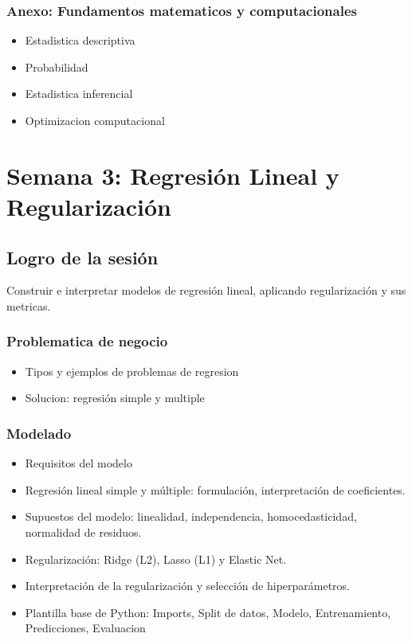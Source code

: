\documentclass[12pt,a4paper,openany,oneside]{book}
\begin{document}
\begin{itemize}
\subsection{Anexo: Fundamentos matematicos y computacionales}
\begin{itemize}
    \item Estadistica descriptiva
    \item Probabilidad
    \item Estadistica inferencial
    \item Optimizacion computacional
\end{itemize}

\chapter{Semana 3: Regresión Lineal y Regularización}

\section{Logro de la sesión}
Construir e interpretar modelos de regresión lineal, aplicando regularización y sus metricas.

\subsection{Problematica de negocio}
\begin{itemize}
    \item Tipos y ejemplos de problemas de regresion
    \item Solucion: regresión simple y multiple
\end{itemize}

\subsection{Modelado}
\begin{itemize}
    \item Requisitos del modelo
    \item Regresión lineal simple y múltiple: formulación, interpretación de coeficientes.
    \item Supuestos del modelo: linealidad, independencia, homocedasticidad, normalidad de residuos.
    \item Regularización: Ridge (L2), Lasso (L1) y Elastic Net.
    \item Interpretación de la regularización y selección de hiperparámetros.
    \item Plantilla base de Python: Imports, Split de datos, Modelo, Entrenamiento, Predicciones, Evaluacion
\end{itemize}


\end{itemize}
\end{document}
